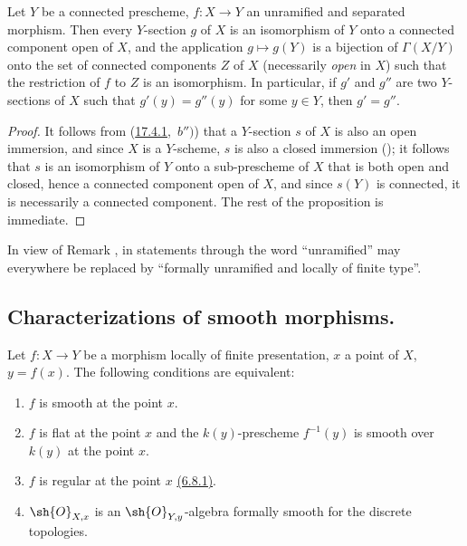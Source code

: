 \begin{proposition}[17.4.9]
\label{IV.17.4.9}
Let $Y$ be a connected prescheme, $f:X\to Y$ an unramified and separated morphism.
Then every $Y$-section $g$ of $X$ is an isomorphism of $Y$ onto a connected component open of $X$, and the application $g\mapsto g(Y)$ is a bijection of $\Gamma(X/Y)$ onto the set of connected components $Z$ of $X$ (necessarily \emph{open} in $X$) such that the restriction of $f$ to $Z$ is an isomorphism.
In particular, if $g'$ and $g''$ are two $Y$-sections of $X$ such that $g'(y)=g''(y)$ for some $y\in Y$, then $g'=g''$.
\end{proposition}

\begin{proof}
It follows from ({\hyperlink{ega4.c04.thm.17-4-1}{17.4.1}},~$b'')$) that a $Y$-section $s$ of $X$ is also an open immersion, and since $X$ is a $Y$-scheme, $s$ is also a closed immersion (); it follows that $s$ is an isomorphism of $Y$ onto a sub-prescheme of $X$ that is both open and closed, hence a connected component open of $X$, and since $s(Y)$ is connected, it is necessarily a connected component.
The rest of the proposition is immediate.
\end{proof}

\begin{remark}[17.4.10]
\label{IV.17.4.10}
In view of Remark , in statements  through  the word ``unramified'' may everywhere be replaced by ``formally unramified and locally of finite type''.
\end{remark}

\subsection{Characterizations of smooth morphisms.}
\label{subsection:IV.17.5}

\begin{theorem}[17.5.1]
\label{IV.17.5.1}
Let $f:X\to Y$ be a morphism locally of finite presentation, $x$ a point of $X$, $y=f(x)$.
The following conditions are equivalent:
\begin{enumerate}[label=(\alph*)]
  \item $f$ is smooth at the point $x$.
  \item $f$ is flat at the point $x$ and the $k(y)$-prescheme $f^{-1}(y)$ is smooth over $k(y)$ at the point $x$.
  \item[b')] $f$ is regular at the point $x$ {\hyperlink{ega4.c04.def.6-8-1}{(6.8.1)}}.
  \item $\sh{O}_{X,x}$ is an $\sh{O}_{Y,y}$-algebra formally smooth for the discrete topologies.
\end{enumerate}
\end{theorem}

